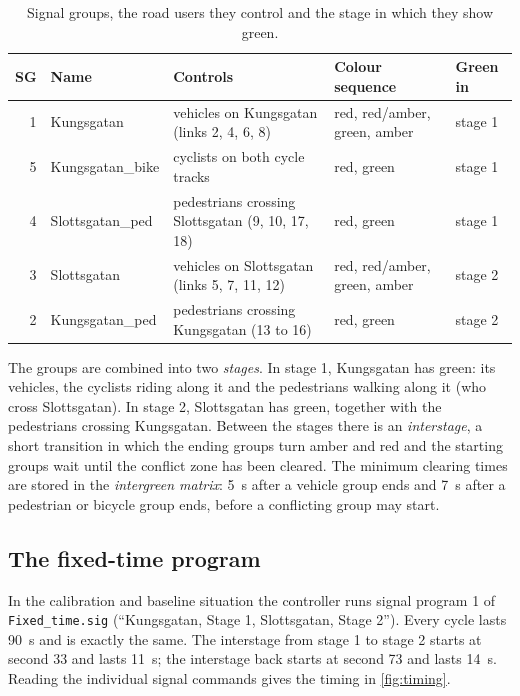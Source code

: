 \documentclass[11pt,a4paper]{article}
\newcommand{\code}[1]{\texttt{#1}}
\begin{document}
\begin{table}[!htb]
\centering
\caption[Signal groups]{Signal groups, the road users they control and the stage in which they
show green.}
\label{tab:sg}
\small
\begin{tabularx}{\textwidth}{rl>{\raggedright\arraybackslash}X>{\raggedright\arraybackslash}p{2.6cm}l}
\toprule
\textbf{SG} & \textbf{Name} & \textbf{Controls} & \textbf{Colour sequence} & \textbf{Green in}\\
\midrule
1 & Kungsgatan      & vehicles on Kungsgatan (links 2, 4, 6, 8)       & red, red/amber, green, amber & stage 1\\
5 & Kungsgatan\_bike & cyclists on both cycle tracks                  & red, green & stage 1\\
4 & Slottsgatan\_ped & pedestrians crossing Slottsgatan (9, 10, 17, 18) & red, green & stage 1\\
3 & Slottsgatan     & vehicles on Slottsgatan (links 5, 7, 11, 12)    & red, red/amber, green, amber & stage 2\\
2 & Kungsgatan\_ped  & pedestrians crossing Kungsgatan (13 to 16)      & red, green & stage 2\\
\bottomrule
\end{tabularx}
\end{table}

The groups are combined into two \emph{stages}. In stage 1, Kungsgatan has green: its vehicles, the
cyclists riding along it and the pedestrians walking along it (who cross Slottsgatan). In stage 2,
Slottsgatan has green, together with the pedestrians crossing Kungsgatan. Between the stages there
is an \emph{interstage}, a short transition in which the ending groups turn amber and red and the
starting groups wait until the conflict zone has been cleared. The minimum clearing times are
stored in the \emph{intergreen matrix}: 5~s after a vehicle group ends and 7~s after a pedestrian
or bicycle group ends, before a conflicting group may start.

\subsection{The fixed-time program}

In the calibration and baseline situation the controller runs signal program 1 of
\code{Fixed\_time.sig} (``Kungsgatan, Stage 1, Slottsgatan, Stage 2''). Every cycle lasts 90~s and
is exactly the same. The interstage from stage 1 to stage 2 starts at second 33 and lasts 11~s;
the interstage back starts at second 73 and lasts 14~s. Reading the individual signal commands gives
the timing in \cref{fig:timing}.
\end{document}
